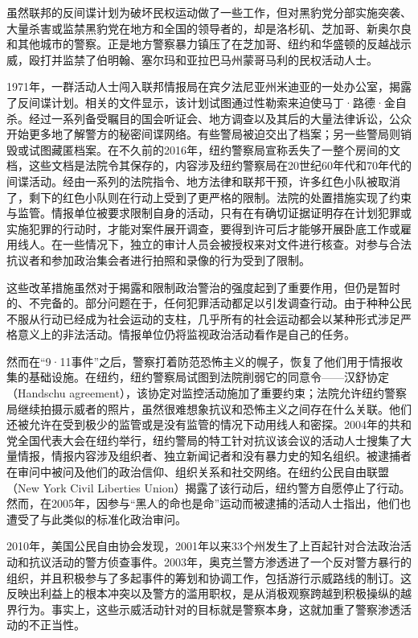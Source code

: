 \documentclass[fontset=fandol, a4paper, 12pt, openright]{ctexbook}
\begin{document}
虽然联邦的反间谍计划为破坏民权运动做了一些工作，但对黑豹党分部实施突袭、大量杀害或监禁黑豹党在地方和全国的领导者的，却是洛杉矶、芝加哥、新奥尔良和其他城市的警察。正是地方警察暴力镇压了在芝加哥、纽约和华盛顿的反越战示威，殴打并监禁了伯明翰、塞尔玛和亚拉巴马州蒙哥马利的民权活动人士。

1971年，一群活动人士闯入联邦情报局在宾夕法尼亚州米迪亚的一处办公室，揭露了反间谍计划。相关的文件显示，该计划试图通过性勒索来迫使马丁·路德·金自杀。经过一系列备受瞩目的国会听证会、地方调查以及其后的大量法律诉讼，公众开始更多地了解警方的秘密间谍网络。有些警局被迫交出了档案；另一些警局则销毁或试图藏匿档案。在不久前的2016年，纽约警察局宣称丢失了一整个房间的文档，这些文档是法院令其保存的，内容涉及纽约警察局在20世纪60年代和70年代的间谍活动。经由一系列的法院指令、地方法律和联邦干预，许多红色小队被取消了，剩下的红色小队则在行动上受到了更严格的限制。法院的处置措施实现了约束与监管。情报单位被要求限制自身的活动，只有在有确切证据证明存在计划犯罪或实施犯罪的行动时，才能对案件展开调查，要得到许可后才能够开展卧底工作或雇用线人。在一些情况下，独立的审计人员会被授权来对文件进行核查。对参与合法抗议者和参加政治集会者进行拍照和录像的行为受到了限制。

这些改革措施虽然对于揭露和限制政治警治的强度起到了重要作用，但仍是暂时的、不完备的。部分问题在于，任何犯罪活动都足以引发调查行动。由于种种公民不服从行动已经成为社会运动的支柱，几乎所有的社会运动都会以某种形式涉足严格意义上的非法活动。情报单位仍将监视政治活动看作是自己的任务。

然而在“9·11事件”之后，警察打着防范恐怖主义的幌子，恢复了他们用于情报收集的基础设施。在纽约，纽约警察局试图到法院削弱它的同意令——汉舒协定（Handschu agreement），该协定对监控活动施加了重要约束；法院允许纽约警察局继续拍摄示威者的照片，虽然很难想象抗议和恐怖主义之间存在什么关联。他们还被允许在受到极少的监管或是没有监管的情况下动用线人和密探。2004年的共和党全国代表大会在纽约举行，纽约警局的特工针对抗议该会议的活动人士搜集了大量情报，情报内容涉及组织者、独立新闻记者和没有暴力史的知名组织。被逮捕者在审问中被问及他们的政治信仰、组织关系和社交网络。在纽约公民自由联盟（New York Civil Liberties Union）揭露了该行动后，纽约警方自愿停止了行动。然而，在2005年，因参与“黑人的命也是命”运动而被逮捕的活动人士指出，他们也遭受了与此类似的标准化政治审问。

2010年，美国公民自由协会发现，2001年以来33个州发生了上百起针对合法政治活动和抗议活动的警方侦查事件。2003年，奥克兰警方渗透进了一个反对警方暴行的组织，并且积极参与了多起事件的筹划和协调工作，包括游行示威路线的制订。这反映出利益上的根本冲突以及警方的滥用职权，是从消极观察跨越到积极操纵的越界行为。事实上，这些示威活动针对的目标就是警察本身，这就加重了警察渗透活动的不正当性。
\end{document}
